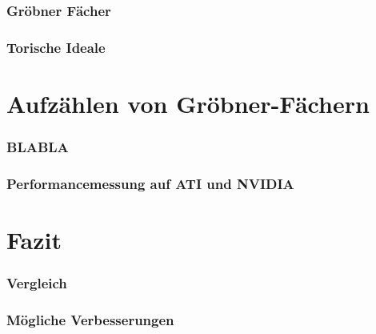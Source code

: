 \documentclass{beamer}
\begin{document}
\begin{frame}[fragile]
\frametitle{Gröbner Fächer}





\end{frame}


\begin{frame}[fragile]
\frametitle{Torische Ideale}



\end{frame}
\section{Aufzählen von Gröbner-Fächern}


\begin{frame}
\frametitle{BLABLA}

\end{frame}

\begin{frame}
\frametitle{Performancemessung auf ATI und NVIDIA}


\end{frame}


\section{Fazit}

\begin{frame}
\frametitle{Vergleich}


	
\end{frame}


\begin{frame}
\frametitle{M\"ogliche Verbesserungen}


 
\end{frame}













\end{document}
